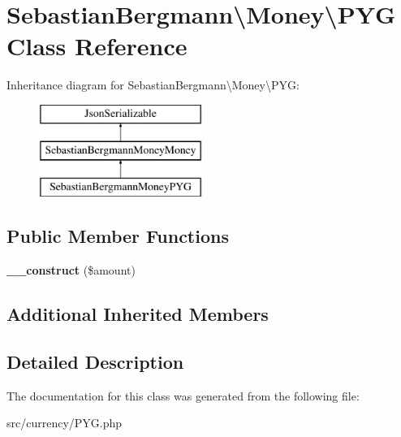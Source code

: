 \hypertarget{classSebastianBergmann_1_1Money_1_1PYG}{}\section{Sebastian\+Bergmann\textbackslash{}Money\textbackslash{}P\+Y\+G Class Reference}
\label{classSebastianBergmann_1_1Money_1_1PYG}
Inheritance diagram for Sebastian\+Bergmann\textbackslash{}Money\textbackslash{}P\+Y\+G\+:\begin{figure}[H]
\begin{center}
\leavevmode
\includegraphics[height=3.000000cm]{classSebastianBergmann_1_1Money_1_1PYG}
\end{center}
\end{figure}
\subsection*{Public Member Functions}
\begin{DoxyCompactItemize}
\item 
\hypertarget{classSebastianBergmann_1_1Money_1_1PYG_a80fb932b4726e03893e668b5bcfaa505}{}{\bfseries \+\_\+\+\_\+construct} (\$amount)\label{classSebastianBergmann_1_1Money_1_1PYG_a80fb932b4726e03893e668b5bcfaa505}

\end{DoxyCompactItemize}
\subsection*{Additional Inherited Members}


\subsection{Detailed Description}


The documentation for this class was generated from the following file\+:\begin{DoxyCompactItemize}
\item 
src/currency/P\+Y\+G.\+php\end{DoxyCompactItemize}
